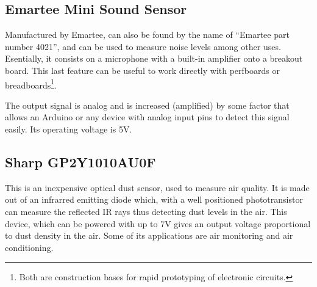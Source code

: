 
\subsection{Emartee Mini Sound Sensor}
\label{sub:sound}

Manufactured by Emartee, can also be found by the name of ``Emartee part number 4021'', and can be used to measure noise levels among other uses. Esentially, it consists on a microphone with a built-in amplifier onto a breakout board. This last feature can be useful to work directly with perfboards or breadboards\footnote{Both are construction bases for rapid prototyping of electronic circuits.}.

The output signal is analog and is increased (amplified) by some factor that allows an Arduino or any device with analog input pins to detect this signal easily\citep{gertz2012environmental}. Its operating voltage is 5V.



\subsection{Sharp GP2Y1010AU0F}
\label{sub:sharp}

This is an inexpensive optical dust sensor, used to measure air quality. It is made out of an infrarred emitting diode which, with a well positioned phototransistor can measure the reflected IR rays thus detecting dust levels in the air\citep{sharp}. This device, which can be powered with up to 7V gives an output voltage proportional to dust density in the air. Some of its applications are air monitoring and air conditioning.

